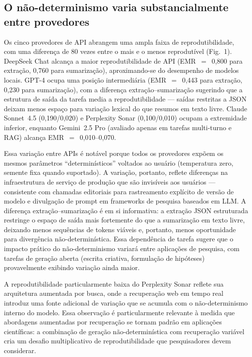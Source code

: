 \documentclass[12pt,a4paper]{article}
\begin{document}
\subsection*{O não-determinismo varia substancialmente entre provedores}

Os cinco provedores de API abrangem uma ampla faixa de reprodutibilidade, com uma diferença de 80 vezes entre o mais e o menos reprodutível (Fig.~1).
DeepSeek Chat alcança a maior reprodutibilidade de API (EMR~$=$~0,800 para extração, 0,760 para sumarização), aproximando-se do desempenho de modelos locais.
GPT-4 ocupa uma posição intermediária (EMR~$=$~0,443 para extração, 0,230 para sumarização), com a diferença extração--sumarização sugerindo que a estrutura de saída da tarefa media a reprodutibilidade --- saídas restritas a JSON deixam menos espaço para variação lexical do que resumos em texto livre.
Claude Sonnet~4.5 (0,190/0,020) e Perplexity Sonar (0,100/0,010) ocupam a extremidade inferior, enquanto Gemini~2.5 Pro (avaliado apenas em tarefas multi-turno e RAG) alcança EMR~$=$~0,010--0,070.

Essa variação entre APIs é notável porque todos os provedores expõem os mesmos parâmetros ``determinísticos'' voltados ao usuário (temperatura zero, semente fixa quando suportado).
A variação, portanto, reflete diferenças na infraestrutura de serviço de produção que são invisíveis aos usuários --- consistente com chamadas editoriais para rastreamento explícito de versão de modelo e divulgação de prompt em frameworks de pesquisa baseados em LLM.
A diferença extração--sumarização é em si informativa: a extração JSON estruturada restringe o espaço de saída mais fortemente do que a sumarização em texto livre, deixando menos sequências de tokens viáveis e, portanto, menos oportunidade para divergência não-determinística.
Essa dependência de tarefa sugere que o impacto prático do não-determinismo variará entre aplicações de pesquisa, com tarefas de geração aberta (escrita criativa, formulação de hipóteses) provavelmente exibindo variação ainda maior.

A reprodutibilidade particularmente baixa do Perplexity Sonar reflete sua arquitetura aumentada por busca, onde a recuperação web em tempo real introduz uma fonte adicional de variação que se acumula com o não-determinismo interno do modelo.
Essa observação é particularmente relevante à medida que abordagens aumentadas por recuperação se tornam padrão em aplicações científicas: a combinação de geração não-determinística com recuperação variável cria um desafio multiplicativo de reprodutibilidade que pesquisadores devem considerar.
\end{document}
